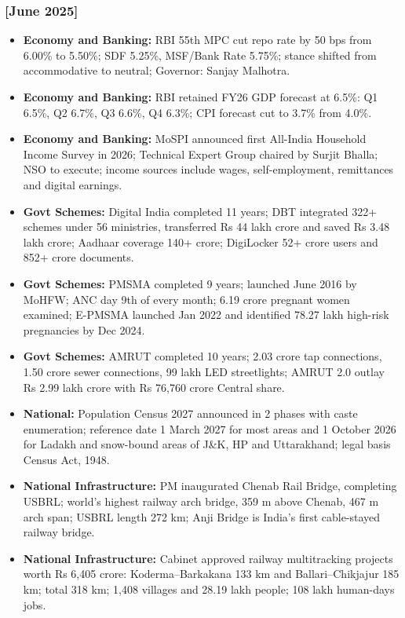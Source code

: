 \documentclass[10pt,a4paper]{article}
\newcommand{\monthtag}[1]{\textbf{[#1]}}
\begin{document}
\subsubsection{\monthtag{June 2025}}
\begin{itemize}
    \item \textbf{Economy and Banking:} RBI 55th MPC cut repo rate by 50 bps from 6.00\% to 5.50\%; SDF 5.25\%, MSF/Bank Rate 5.75\%; stance shifted from accommodative to neutral; Governor: Sanjay Malhotra.
    \item \textbf{Economy and Banking:} RBI retained FY26 GDP forecast at 6.5\%: Q1 6.5\%, Q2 6.7\%, Q3 6.6\%, Q4 6.3\%; CPI forecast cut to 3.7\% from 4.0\%.
    \item \textbf{Economy and Banking:} MoSPI announced first All-India Household Income Survey in 2026; Technical Expert Group chaired by Surjit Bhalla; NSO to execute; income sources include wages, self-employment, remittances and digital earnings.
    \item \textbf{Govt Schemes:} Digital India completed 11 years; DBT integrated 322+ schemes under 56 ministries, transferred Rs 44 lakh crore and saved Rs 3.48 lakh crore; Aadhaar coverage 140+ crore; DigiLocker 52+ crore users and 852+ crore documents.
    \item \textbf{Govt Schemes:} PMSMA completed 9 years; launched June 2016 by MoHFW; ANC day 9th of every month; 6.19 crore pregnant women examined; E-PMSMA launched Jan 2022 and identified 78.27 lakh high-risk pregnancies by Dec 2024.
    \item \textbf{Govt Schemes:} AMRUT completed 10 years; 2.03 crore tap connections, 1.50 crore sewer connections, 99 lakh LED streetlights; AMRUT 2.0 outlay Rs 2.99 lakh crore with Rs 76,760 crore Central share.
    \item \textbf{National:} Population Census 2027 announced in 2 phases with caste enumeration; reference date 1 March 2027 for most areas and 1 October 2026 for Ladakh and snow-bound areas of J\&K, HP and Uttarakhand; legal basis Census Act, 1948.
    \item \textbf{National Infrastructure:} PM inaugurated Chenab Rail Bridge, completing USBRL; world's highest railway arch bridge, 359 m above Chenab, 467 m arch span; USBRL length 272 km; Anji Bridge is India's first cable-stayed railway bridge.
    \item \textbf{National Infrastructure:} Cabinet approved railway multitracking projects worth Rs 6,405 crore: Koderma--Barkakana 133 km and Ballari--Chikjajur 185 km; total 318 km; 1,408 villages and 28.19 lakh people; 108 lakh human-days jobs.

\end{itemize}
\end{document}
